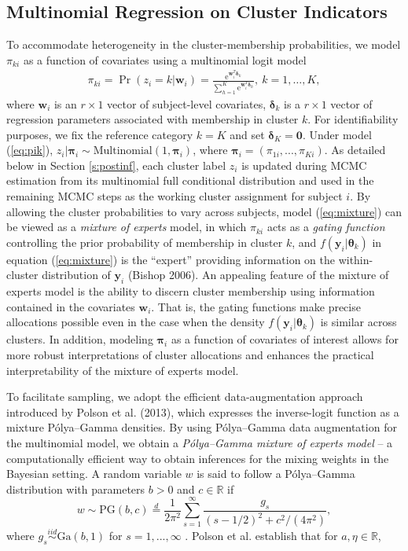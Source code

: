 \documentclass[useAMS,referee]{biom}
\begin{document}
\subsection{Multinomial Regression on Cluster Indicators}
\label{s:multinom}
To accommodate heterogeneity in the cluster-membership probabilities, we model $\pi_{ki}$ as a function of covariates using a multinomial logit model 
\begin{eqnarray}
\label{eq:pik}
\pi_{ki} = \Pr(z_i = k|\mathbf{w}_i) = \frac{\text{e}^{\mathbf{w}_i^T \boldsymbol\delta_k}}{\sum_{h = 1}^K \text{e}^{\mathbf{w}_i^T \boldsymbol\delta_{h}}},~ k=1,\ldots,K,
\end{eqnarray}
where $\mathbf{w}_i$ is an $r\times 1$ vector of subject-level covariates, $\boldsymbol\delta_k$ is a $r\times 1$ vector of regression parameters associated with membership in cluster $k$. For identifiability purposes, we fix the reference category $k = K$ and set $\boldsymbol\delta_K = \mathbf{0}$. Under model (\ref{eq:pik}), $z_i|\boldsymbol\pi_i \sim \text{Multinomial}(1,\boldsymbol\pi_i)$, where $\boldsymbol\pi_i = (\pi_{1i},...,\pi_{Ki})$. As detailed below in Section \ref{s:postinf}, each cluster label $z_i$ is updated during MCMC estimation from its multinomial full conditional distribution and used in the remaining MCMC steps as the working cluster assignment for subject $i$. By allowing the cluster probabilities to vary across subjects, model (\ref{eq:mixture}) can be viewed as a \textit{mixture of experts} model, in which $\pi_{ki}$ acts as a \textit{gating function} controlling the prior probability of membership in cluster $k$, and $f(\mathbf{y}_i|\boldsymbol\theta_k)$ in equation (\ref{eq:mixture}) is the ``expert'' providing information on the within-cluster distribution of $\mathbf{y}_i$ (Bishop 2006). An appealing feature of the mixture of experts model is the ability to discern cluster membership using information contained in the covariates $\mathbf{w}_i$. That is, the gating functions make precise allocations possible even in the case when the density $f(\mathbf{y}_i | \boldsymbol\theta_k)$ is similar across clusters. In addition, modeling $\boldsymbol\pi_i$ as a function of covariates of interest allows for more robust interpretations of cluster allocations and enhances the practical interpretability of the mixture of experts model. 

To facilitate sampling, we adopt the efficient data-augmentation approach introduced by Polson {et al.} (2013), which expresses the inverse-logit function as a mixture P\'olya--Gamma densities. By using P\'olya--Gamma data augmentation for the multinomial model, we obtain a \textit{P\'olya--Gamma mixture of experts model} -- a computationally efficient way to obtain inferences for the mixing weights in the Bayesian setting. A random variable ${w}$ is said to follow a P\'olya--Gamma distribution with parameters $b > 0$ and $c \in \mathbb{R}$ if
\begin{equation}
{w} \sim \text{PG}(b,c) \stackrel{d}{=} \frac{1}{2\pi^2}\sum_{s=1}^{\infty}\frac{g_s}{(s-1/2)^2 + c^2/(4\pi^2)}, \label{eq:pg1}
\end{equation}
where $g_s \stackrel{iid}{\sim} \text{Ga}(b,1)$ for $s = 1,...,\infty$ . Polson {et al.} establish that for $a,\eta \in \mathbb{R}$, 
\end{document}
